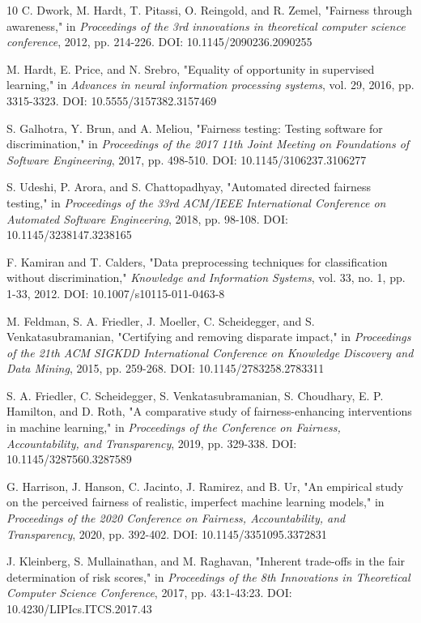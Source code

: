 \documentclass[10pt,journal,compsoc]{IEEEtran}
\begin{document}
\begin{thebibliography}{10}
C. Dwork, M. Hardt, T. Pitassi, O. Reingold, and R. Zemel, "Fairness through awareness," in \textit{Proceedings of the 3rd innovations in theoretical computer science conference}, 2012, pp. 214-226. DOI: 10.1145/2090236.2090255

M. Hardt, E. Price, and N. Srebro, "Equality of opportunity in supervised learning," in \textit{Advances in neural information processing systems}, vol. 29, 2016, pp. 3315-3323. DOI: 10.5555/3157382.3157469

S. Galhotra, Y. Brun, and A. Meliou, "Fairness testing: Testing software for discrimination," in \textit{Proceedings of the 2017 11th Joint Meeting on Foundations of Software Engineering}, 2017, pp. 498-510. DOI: 10.1145/3106237.3106277

S. Udeshi, P. Arora, and S. Chattopadhyay, "Automated directed fairness testing," in \textit{Proceedings of the 33rd ACM/IEEE International Conference on Automated Software Engineering}, 2018, pp. 98-108. DOI: 10.1145/3238147.3238165

F. Kamiran and T. Calders, "Data preprocessing techniques for classification without discrimination," \textit{Knowledge and Information Systems}, vol. 33, no. 1, pp. 1-33, 2012. DOI: 10.1007/s10115-011-0463-8

M. Feldman, S. A. Friedler, J. Moeller, C. Scheidegger, and S. Venkatasubramanian, "Certifying and removing disparate impact," in \textit{Proceedings of the 21th ACM SIGKDD International Conference on Knowledge Discovery and Data Mining}, 2015, pp. 259-268. DOI: 10.1145/2783258.2783311

S. A. Friedler, C. Scheidegger, S. Venkatasubramanian, S. Choudhary, E. P. Hamilton, and D. Roth, "A comparative study of fairness-enhancing interventions in machine learning," in \textit{Proceedings of the Conference on Fairness, Accountability, and Transparency}, 2019, pp. 329-338. DOI: 10.1145/3287560.3287589

G. Harrison, J. Hanson, C. Jacinto, J. Ramirez, and B. Ur, "An empirical study on the perceived fairness of realistic, imperfect machine learning models," in \textit{Proceedings of the 2020 Conference on Fairness, Accountability, and Transparency}, 2020, pp. 392-402. DOI: 10.1145/3351095.3372831

J. Kleinberg, S. Mullainathan, and M. Raghavan, "Inherent trade-offs in the fair determination of risk scores," in \textit{Proceedings of the 8th Innovations in Theoretical Computer Science Conference}, 2017, pp. 43:1-43:23. DOI: 10.4230/LIPIcs.ITCS.2017.43


\end{thebibliography}
\end{document}
